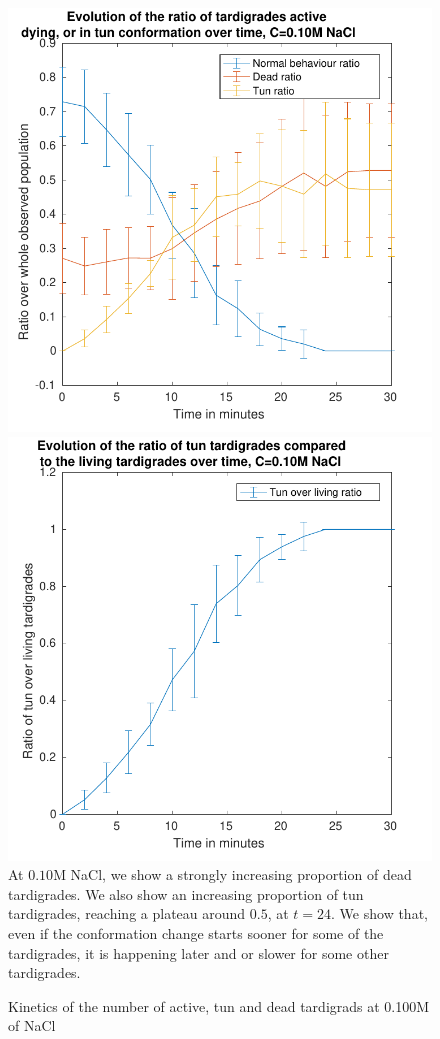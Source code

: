 \documentclass[12pt,a4paper, twocolumn]{article}
\begin{document}
\begin{figure}
\includegraphics[width=\linewidth]{010.pdf}
\includegraphics[width=\linewidth]{010t.pdf}
\label{fig010}
At $0.10$M NaCl, we show a strongly increasing proportion of dead tardigrades. We also show an increasing proportion of tun tardigrades, reaching a plateau around $0.5$, at $t=24$. We show that, even if the conformation change starts sooner for some of the tardigrades, it is happening later and or slower for some other tardigrades.
\caption{Kinetics of the number of active, tun and dead tardigrads at 0.100M of NaCl}
\end{figure}
\end{document}
